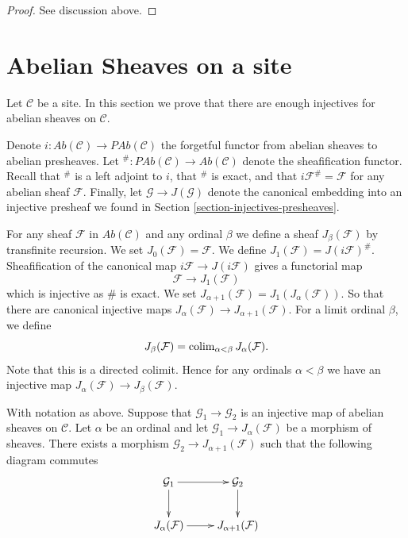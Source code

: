 \begin{proof}
See discussion above.
\end{proof}












\section{Abelian Sheaves on a site}
\label{section-injectives-sheaves}

\noindent
Let $\mathcal{C}$ be a site. In this section we prove that there are
enough injectives for abelian sheaves on $\mathcal{C}$.

\medskip\noindent
Denote
$i : \textit{Ab}(\mathcal{C}) \longrightarrow \textit{PAb}(\mathcal{C})$
the forgetful functor from abelian sheaves to abelian presheaves.
Let
${}^\# : \textit{PAb}(\mathcal{C}) \longrightarrow \textit{Ab}(\mathcal{C})$
denote the sheafification functor. Recall that ${}^\#$ is a left adjoint
to $i$, that ${}^\#$ is exact, and that $i\mathcal{F}^\# = \mathcal{F}$
for any abelian sheaf $\mathcal{F}$. Finally, let
$\mathcal{G} \to J(\mathcal{G})$ denote the canonical
embedding into an injective presheaf we found in
Section \ref{section-injectives-presheaves}.

\medskip\noindent
For any sheaf $\mathcal{F}$ in $\textit{Ab}(\mathcal{C})$ and
any ordinal $\beta$ we define a sheaf
$J_\beta(\mathcal{F})$ by transfinite recursion.
We set $J_0(\mathcal{F}) = \mathcal{F}$.
We define $J_1(\mathcal{F}) = J(i\mathcal{F})^\#$.
Sheafification of the canonical map $i\mathcal{F} \to J(i\mathcal{F})$
gives a functorial map
$$
\mathcal{F} \longrightarrow J_1(\mathcal{F})
$$
which is injective as $\#$ is exact. We set
$J_{\alpha + 1}(\mathcal{F}) = J_1(J_\alpha(\mathcal{F}))$.
So that there are canonical injective maps
$J_\alpha(\mathcal{F}) \to J_{\alpha + 1}(\mathcal{F})$.
For a limit ordinal $\beta$, we define
$$
J_\beta(\mathcal{F}) = \mathop{\mathrm{colim}}\nolimits_{\alpha < \beta} J_\alpha(\mathcal{F}).
$$
Note that this is a directed colimit. Hence for any ordinals $\alpha < \beta$
we have an injective map $J_\alpha(\mathcal{F}) \to J_\beta(\mathcal{F})$.

\begin{lemma}
\label{lemma-map-into-next-one}
With notation as above.
Suppose that $\mathcal{G}_1 \to \mathcal{G}_2$ is an injective
map of abelian sheaves on $\mathcal{C}$. Let $\alpha$ be an ordinal
and let $\mathcal{G}_1 \to J_\alpha(\mathcal{F})$ be a morphism
of sheaves. There exists a morphism $\mathcal{G}_2 \to
J_{\alpha + 1}(\mathcal{F})$ such that the following diagram commutes
$$
\xymatrix{
\mathcal{G}_1 \ar[d] \ar[r] & \mathcal{G}_2 \ar[d] \\
J_{\alpha}(\mathcal{F}) \ar[r] & J_{\alpha + 1}(\mathcal{F}) }
$$
\end{lemma}

